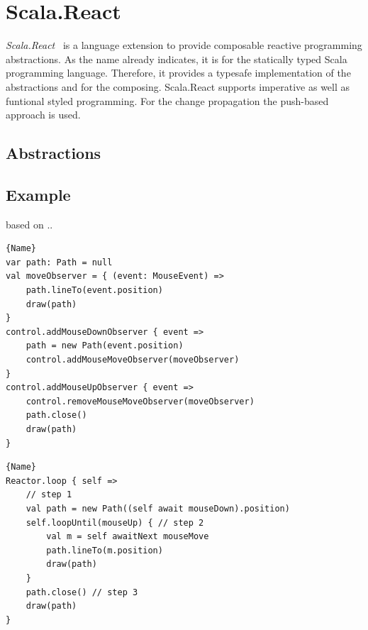 \documentclass[acmsmall]{acmart}\settopmatter{printfolios=true,printccs=false,printacmref=false}
\begin{document}
\section{Scala.React}
	\textit{Scala.React}~\cite{Maier:2012} is a language extension to provide composable reactive programming abstractions.
	As the name already indicates, it is for the statically typed Scala programming language. 
	Therefore, it provides a typesafe implementation of the abstractions and for the composing. 
	Scala.React supports imperative as well as funtional styled programming.
	For the change propagation the push-based approach is used.
	



	\subsection{Abstractions}

	\subsection{Example}

	based on ..\cite{coplien1995reactor}

	\noindent\begin{minipage}{.48\textwidth}
		\begin{lstlisting}[style=myScalastyle,caption={Observer pattern},frame=none]{Name}
var path: Path = null
val moveObserver = { (event: MouseEvent) =>
	path.lineTo(event.position)
	draw(path)
}
control.addMouseDownObserver { event =>
	path = new Path(event.position)
	control.addMouseMoveObserver(moveObserver)
}
control.addMouseUpObserver { event =>
	control.removeMouseMoveObserver(moveObserver)
	path.close()
	draw(path)
}
		\end{lstlisting}
		\end{minipage}\hfill
		\begin{minipage}{.48\textwidth}
		\begin{lstlisting}[style=myScalastyle,caption={Scala.React},frame=none]{Name}
Reactor.loop { self =>
	// step 1
	val path = new Path((self await mouseDown).position)
	self.loopUntil(mouseUp) { // step 2
		val m = self awaitNext mouseMove
		path.lineTo(m.position)
		draw(path)
	}
	path.close() // step 3
	draw(path)
}
		\end{lstlisting}
		\end{minipage}
\end{document}
